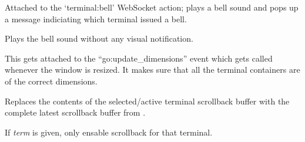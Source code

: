 \documentclass[letterpaper,10pt,openany]{sphinxmanual}
\begin{document}

\begin{fulllineitems}
\label{Applications/terminal/js_terminal:GateOne.Terminal.bellAction}
Attached to the `terminal:bell' WebSocket action; plays a bell sound and pops up a message indiciating which terminal issued a bell.

\end{fulllineitems}


\begin{fulllineitems}
\label{Applications/terminal/js_terminal:GateOne.Terminal.playBell}
Plays the bell sound without any visual notification.

\end{fulllineitems}


\begin{fulllineitems}
\label{Applications/terminal/js_terminal:GateOne.Terminal.updateDimensions}
This gets attached to the ``go:update\_dimensions'' event which gets called whenever the window is resized.  It makes sure that all the terminal containers are of the correct dimensions.

\end{fulllineitems}


\begin{fulllineitems}
\label{Applications/terminal/js_terminal:GateOne.Terminal.enableScrollback}
Replaces the contents of the selected/active terminal scrollback buffer with the complete latest scrollback buffer from .

If \emph{term} is given, only ensable scrollback for that terminal.

\end{fulllineitems}

\end{document}
